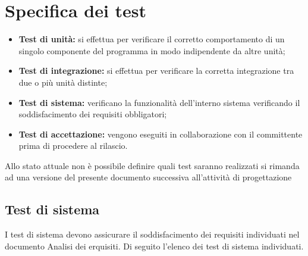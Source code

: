 
\newcommand{\stepCTS}[0]{\stepcounter{CTS}} %
\newcommand{\valueCTS}[0]{\stepCTS TS\arabic{CTS}} %
\newcommand{\resetCTS}[0]{\setcounter{CTS}{0}}
\resetCTS
\section{Specifica dei test}
\begin{itemize}
    \item \textbf{Test di unità:} si effettua per verificare il corretto comportamento di un singolo componente del programma in modo indipendente da altre unità;
    \item \textbf{Test di integrazione:} si effettua per verificare la corretta integrazione tra due o più unità distinte;
    \item \textbf{Test di sistema:} verificano la funzionalità dell'interno sistema verificando il soddisfacimento dei requisiti obbligatori;
    \item \textbf{Test di accettazione:} vengono eseguiti in collaborazione con il committente prima di procedere al rilascio.
\end{itemize}

Allo stato attuale non è possibile definire quali test saranno realizzati si rimanda ad una versione del presente documento successiva all'attività di progettazione


\subsection{Test di sistema}

I test di sistema devono assicurare il soddisfacimento dei requisiti individuati nel documento Analisi dei erquisiti. 
Di seguito l'elenco dei test di sistema individuati.

